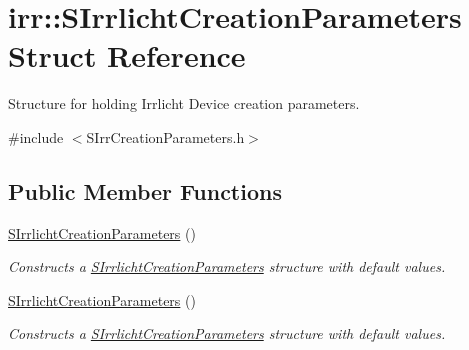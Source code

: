 \hypertarget{structirr_1_1SIrrlichtCreationParameters}{}\section{irr\+:\+:S\+Irrlicht\+Creation\+Parameters Struct Reference}
\label{structirr_1_1SIrrlichtCreationParameters}


Structure for holding Irrlicht Device creation parameters.  




{\ttfamily \#include $<$S\+Irr\+Creation\+Parameters.\+h$>$}

\subsection*{Public Member Functions}
\begin{DoxyCompactItemize}
\item 
\mbox{\label{structirr_1_1SIrrlichtCreationParameters_a466e3b6d57ea40bdcacd6aae892845f1}} 
\hyperlink{structirr_1_1SIrrlichtCreationParameters_a466e3b6d57ea40bdcacd6aae892845f1}{S\+Irrlicht\+Creation\+Parameters} ()
\begin{DoxyCompactList}\small\item\em Constructs a \hyperlink{structirr_1_1SIrrlichtCreationParameters}{S\+Irrlicht\+Creation\+Parameters} structure with default values. \end{DoxyCompactList}\item 
\mbox{\label{structirr_1_1SIrrlichtCreationParameters_a466e3b6d57ea40bdcacd6aae892845f1}} 
\hyperlink{structirr_1_1SIrrlichtCreationParameters_a466e3b6d57ea40bdcacd6aae892845f1}{S\+Irrlicht\+Creation\+Parameters} ()
\begin{DoxyCompactList}\small\item\em Constructs a \hyperlink{structirr_1_1SIrrlichtCreationParameters}{S\+Irrlicht\+Creation\+Parameters} structure with default values. \end{DoxyCompactList}\end{DoxyCompactItemize}
